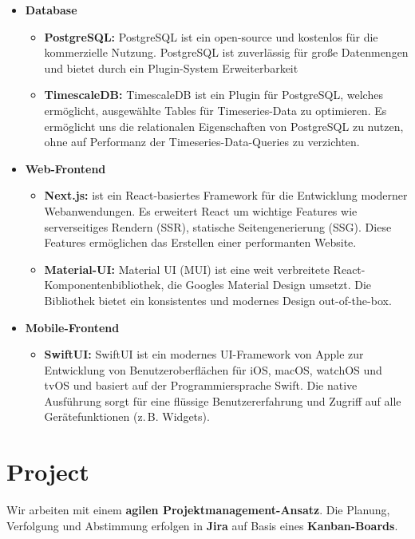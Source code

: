 \documentclass{article}
\begin{document}
\begin{itemize}
  \item \textbf{Database}
    \begin{itemize}
      \item \textbf{PostgreSQL:} PostgreSQL ist ein open-source und kostenlos für die kommerzielle Nutzung. PostgreSQL ist zuverlässig für große Datenmengen und bietet durch ein Plugin-System Erweiterbarkeit
      \item \textbf{TimescaleDB:} TimescaleDB ist ein Plugin für PostgreSQL, welches ermöglicht, ausgewählte Tables für Timeseries-Data zu optimieren. Es ermöglicht uns die relationalen Eigenschaften von PostgreSQL zu nutzen, ohne auf Performanz der Timeseries-Data-Queries zu verzichten.
    \end{itemize}

  \item \textbf{Web-Frontend}
    \begin{itemize}
      \item \textbf{Next.js:} ist ein React-basiertes Framework für die Entwicklung moderner Webanwendungen. Es erweitert React um wichtige Features wie serverseitiges Rendern (SSR), statische Seitengenerierung (SSG). Diese Features ermöglichen das Erstellen einer performanten Website.
      \item \textbf{Material-UI:} Material UI (MUI) ist eine weit verbreitete React-Komponentenbibliothek, die Googles Material Design umsetzt. Die Bibliothek bietet ein konsistentes und modernes Design out-of-the-box.
    \end{itemize}

  \item \textbf{Mobile-Frontend}
    \begin{itemize}
      \item \textbf{SwiftUI:} SwiftUI ist ein modernes UI-Framework von Apple zur Entwicklung von Benutzeroberflächen für iOS, macOS, watchOS und tvOS und basiert auf der Programmiersprache Swift. Die native Ausführung sorgt für eine flüssige Benutzererfahrung und Zugriff auf alle Gerätefunktionen (z.\,B. Widgets).
    \end{itemize}
\end{itemize}


\pagebreak
\section{Project}
Wir arbeiten mit einem \textbf{agilen Projektmanagement-Ansatz}. Die Planung, Verfolgung und Abstimmung erfolgen in \textbf{Jira} auf Basis eines \textbf{Kanban-Boards}.
\end{document}
